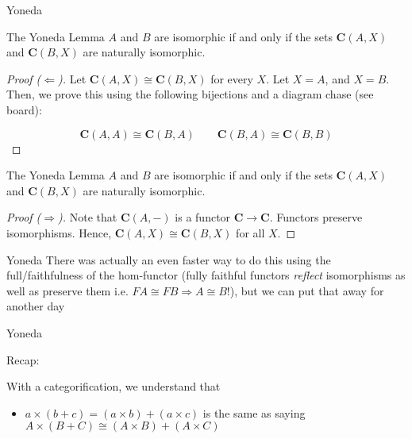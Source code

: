 \documentclass[tikz]{beamer}
\theoremstyle{definition}
\begin{document}
\begin{frame}{Yoneda}
    \begin{block}{The Yoneda Lemma}
        $A$ and $B$ are isomorphic if and only if the sets $\mathbf{C}(A, X) $ and $\mathbf{C}(B, X)$ are naturally isomorphic.
    \end{block}{}
    
    \begin{proof}[Proof ($\Leftarrow$)]
    
        Let $\mathbf{C}(A, X) \cong \mathbf{C}(B, X)$ for every $X$. Let $X = A$, and $X = B$. Then, we prove this using the following bijections and a diagram chase (see board): 
        
        \begin{equation*}
            \mathbf{C}(A, A) \cong \mathbf{C}(B, A) \qquad \mathbf{C}(B, A) \cong \mathbf{C}(B, B)
        \end{equation*}{}
    \end{proof}
\end{frame}

\begin{frame}[fragile]
    \begin{block}{The Yoneda Lemma}
        $A$ and $B$ are isomorphic if and only if the sets $\mathbf{C}(A, X) $ and $\mathbf{C}(B, X)$ are naturally isomorphic.
    \end{block}{}
    
    \begin{proof}[Proof ($\Rightarrow$)]
    
        Note that $\mathbf{C}(A,-)$ is a functor $\mathbf{C} \to \mathbf{C}$. Functors preserve isomorphisms. Hence, $\mathbf{C}(A, X) \cong \mathbf{C}(B, X)$ for all $X$.

    \end{proof}
\end{frame}

\begin{frame}{Yoneda}
    There was actually an even faster way to do this using the full/faithfulness of the hom-functor (fully faithful functors \textit{reflect} isomorphisms as well as preserve them i.e. $FA \cong FB \Rightarrow A \cong B$!), but we can put that away for another day
\end{frame}

\begin{frame}{Yoneda}

Recap:

\begin{block}{}
    With a categorification, we understand that 
    \begin{itemize}
        \item $a \times (b + c) = (a \times b) + (a \times c)$ is the same as saying $A \times (B + C) \cong (A \times B) + (A \times C)$
    \end{itemize}{}
\end{block}{}
    
\end{frame}
\end{document}

